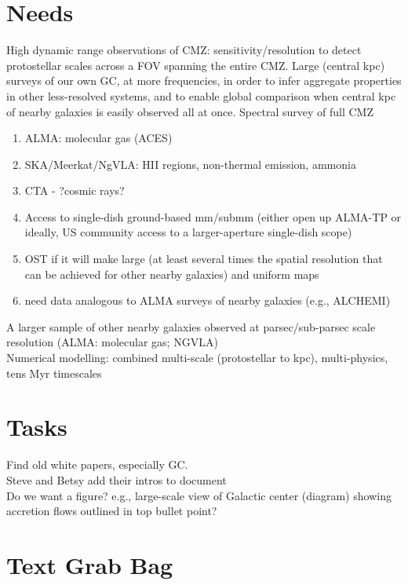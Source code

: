 \documentclass{article}
\begin{document}
\section{Needs}
High dynamic range observations of CMZ: sensitivity/resolution to detect protostellar scales across a FOV spanning the entire CMZ. Large (central kpc) surveys of our own GC, at more frequencies, in order to infer aggregate properties in other less-resolved systems, and to enable global comparison when central kpc of nearby galaxies is easily observed all at once. Spectral survey of full CMZ
\begin{enumerate}
    \item ALMA: molecular gas (ACES)
    \item SKA/Meerkat/NgVLA: HII regions, non-thermal emission, ammonia
    \item CTA - ?cosmic rays?
    \item Access to single-dish ground-based mm/submm  (either open up ALMA-TP or ideally, US community access to a larger-aperture single-dish scope)
    \item OST if it will make large (at least several times the spatial resolution that can be achieved for other nearby galaxies)  and uniform maps
    \item need data analogous to ALMA surveys of nearby galaxies (e.g., ALCHEMI)
\end{enumerate}
A larger sample of other nearby galaxies observed at parsec/sub-parsec scale resolution (ALMA: molecular gas; NGVLA)\\
Numerical modelling: combined multi-scale (protostellar to kpc), multi-physics, tens Myr timescales

\section{Tasks}
Find old white papers, especially GC. \\
Steve and Betsy add their intros to document\\


Do we want a figure?  e.g., large-scale view of Galactic center (diagram) showing accretion flows outlined in top bullet point? \\


\section{Text Grab Bag}
\end{document}
